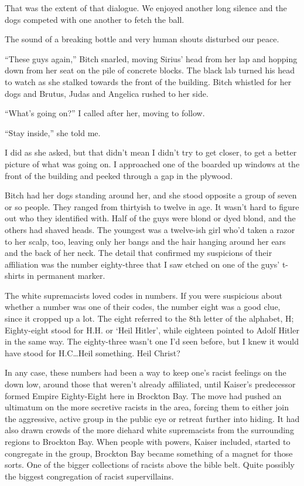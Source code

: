 That was the extent of that dialogue.  We enjoyed another long silence and the dogs competed with one another to fetch the ball.



The sound of a breaking bottle and very human shouts disturbed our peace.



``These guys again,'' Bitch snarled, moving Sirius' head from her lap and hopping down from her seat on the pile of concrete blocks.  The black lab turned his head to watch as she stalked towards the front of the building.  Bitch whistled for her dogs and Brutus, Judas and Angelica rushed to her side.



``What's going on?'' I called after her, moving to follow.



``Stay inside,'' she told me.



I did as she asked, but that didn't mean I didn't try to get closer, to get a better picture of what was going on.  I approached one of the boarded up windows at the front of the building and peeked through a gap in the plywood.



Bitch had her dogs standing around her, and she stood opposite a group of seven or so people.  They ranged from thirtyish to twelve in age.  It wasn't hard to figure out who they identified with.  Half of the guys were blond or dyed blond, and the others had shaved heads.   The youngest was a twelve-ish girl who'd taken a razor to her scalp, too, leaving only her bangs and the hair hanging around her ears and the back of her neck.  The detail that confirmed my suspicions of their affiliation was the number eighty-three that I saw etched on one of the guys' t-shirts in permanent marker.



The white supremacists loved codes in numbers.  If you were suspicious about whether a number was one of their codes, the number eight was a good clue, since it cropped up a lot.  The eight referred to the 8th letter of the alphabet, H; Eighty-eight stood for H.H. or `Heil Hitler', while eighteen pointed to Adolf Hitler in the same way.  The eighty-three wasn't one I'd seen before, but I knew it would have stood for H.C\ldots Heil something.  Heil Christ?



In any case, these numbers had been a way to keep one's racist feelings on the down low, around those that weren't already affiliated, until Kaiser's predecessor formed Empire Eighty-Eight here in Brockton Bay.  The move had pushed an ultimatum on the more secretive racists in the area, forcing them to either join the aggressive, active group in the public eye or retreat further into hiding.   It had also drawn crowds of the more diehard white supremacists from the surrounding regions to Brockton Bay.  When people with powers, Kaiser included, started to congregate in the group, Brockton Bay became something of a magnet for those sorts.  One of the bigger collections of racists above the bible belt.  Quite possibly the biggest congregation of racist supervillains.



